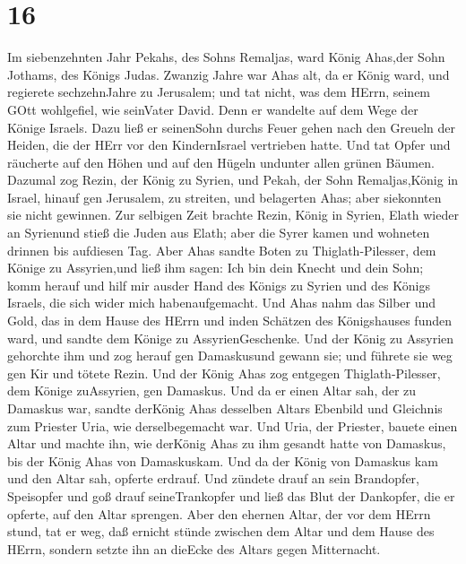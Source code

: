 \hypertarget{section-15}{%
\section{16}\label{section-15}}

 Im siebenzehnten Jahr Pekahs, des Sohns Remaljas, ward
König Ahas,der Sohn Jothams, des Königs Judas.  Zwanzig
Jahre war Ahas alt, da er König ward, und regierete sechzehnJahre zu
Jerusalem; und tat nicht, was dem HErrn, seinem GOtt wohlgefiel, wie
seinVater David.  Denn er wandelte auf dem Wege der Könige
Israels. Dazu ließ er seinenSohn durchs Feuer gehen nach den Greueln der
Heiden, die der HErr vor den KindernIsrael vertrieben hatte.
 Und tat Opfer und räucherte auf den Höhen und auf den
Hügeln undunter allen grünen Bäumen.  Dazumal zog Rezin, der
König zu Syrien, und Pekah, der Sohn Remaljas,König in Israel, hinauf
gen Jerusalem, zu streiten, und belagerten Ahas; aber siekonnten sie
nicht gewinnen.  Zur selbigen Zeit brachte Rezin, König in
Syrien, Elath wieder an Syrienund stieß die Juden aus Elath; aber die
Syrer kamen und wohneten drinnen bis aufdiesen Tag.  Aber
Ahas sandte Boten zu Thiglath-Pilesser, dem Könige zu Assyrien,und ließ
ihm sagen: Ich bin dein Knecht und dein Sohn; komm herauf und hilf mir
ausder Hand des Königs zu Syrien und des Königs Israels, die sich wider
mich habenaufgemacht.  Und Ahas nahm das Silber und Gold,
das in dem Hause des HErrn und inden Schätzen des Königshauses funden
ward, und sandte dem Könige zu AssyrienGeschenke.  Und der
König zu Assyrien gehorchte ihm und zog herauf gen Damaskusund gewann
sie; und führete sie weg gen Kir und tötete Rezin.  Und der
König Ahas zog entgegen Thiglath-Pilesser, dem Könige zuAssyrien, gen
Damaskus. Und da er einen Altar sah, der zu Damaskus war, sandte
derKönig Ahas desselben Altars Ebenbild und Gleichnis zum Priester Uria,
wie derselbegemacht war.  Und Uria, der Priester, bauete
einen Altar und machte ihn, wie derKönig Ahas zu ihm gesandt hatte von
Damaskus, bis der König Ahas von Damaskuskam.  Und da der
König von Damaskus kam und den Altar sah, opferte erdrauf. 
Und zündete drauf an sein Brandopfer, Speisopfer und goß drauf
seineTrankopfer und ließ das Blut der Dankopfer, die er opferte, auf den
Altar sprengen.  Aber den ehernen Altar, der vor dem HErrn
stund, tat er weg, daß ernicht stünde zwischen dem Altar und dem Hause
des HErrn, sondern setzte ihn an dieEcke des Altars gegen Mitternacht.
